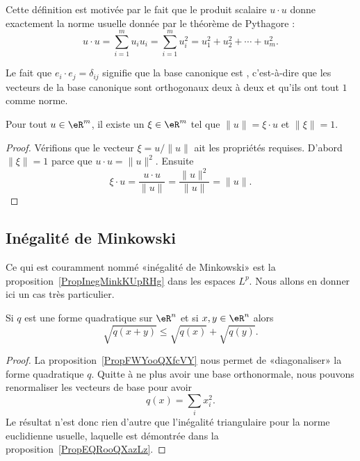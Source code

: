 Cette définition est motivée par le fait que le produit scalaire $u\cdot u$ donne exactement la norme usuelle donnée par le théorème de Pythagore :
\begin{equation}
	u\cdot u=\sum_{i=1}^mu_iu_i=\sum_{i=1}^m u_i^2=u_1^2+u_2^2+\cdots+u_m^2.
\end{equation}

Le fait que $e_i\cdot e_j=\delta_{ij}$ signifie que la base canonique est , c'est-à-dire que les vecteurs de la base canonique sont orthogonaux deux à deux et qu'ils ont tout $1$ comme norme.

\begin{lemma}\label{LemSclNormeXi}
	Pour tout $u\in\eR^m$, il existe un $\xi\in\eR^m$ tel que $\| u \|=\xi\cdot u$ et $\| \xi \|=1$.
\end{lemma}

\begin{proof}
	Vérifions que le vecteur $\xi=u/\| u \|$ ait les propriétés requises. D'abord $\| \xi \|=1$ parce que $u\cdot u=\| u \|^2$. Ensuite
	\begin{equation}
		\xi\cdot u=\frac{ u\cdot u }{ \| u \| }=\frac{ \| u \|^2 }{ \| u \| }=\| u \|.
	\end{equation}
\end{proof}

\subsection{Inégalité de Minkowski}

Ce qui est couramment nommé «inégalité de Minkowski» est la proposition~\ref{PropInegMinkKUpRHg} dans les espaces \( L^p\). Nous allons en donner ici un cas très particulier.

\begin{proposition} \label{PropACHooLtsMUL}
    Si \( q\) est une forme quadratique sur \( \eR^n\) et si \( x,y\in \eR^n\) alors
    \begin{equation}
        \sqrt{q(x+y)}\leq\sqrt{q(x)}+\sqrt{q(y)}.
    \end{equation}
\end{proposition}

\begin{proof}
    La proposition~\ref{PropFWYooQXfcVY} nous permet de «diagonaliser» la forme quadratique \( q\). Quitte à ne plus avoir une base orthonormale, nous pouvons renormaliser les vecteurs de base pour avoir
    \begin{equation}
        q(x)=\sum_ix_i^2.
    \end{equation}
    Le résultat n'est donc rien d'autre que l'inégalité triangulaire pour la norme euclidienne usuelle, laquelle est démontrée dans la proposition~\ref{PropEQRooQXazLz}.
\end{proof}


